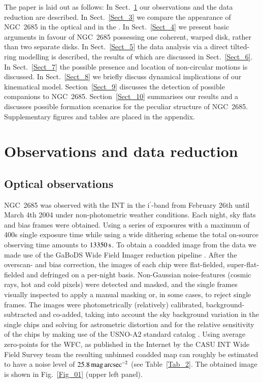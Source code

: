 \documentclass[oldversion]{aa}
\begin{document}
The paper is laid out as follows: In Sect.~\ref{Sect_2} our
observations and the data reduction are described. In
Sect.~\ref{Sect_3} we compare the appearance of NGC~2685 in the optical
and in the .  In Sect.~\ref{Sect_4} we present basic
arguments in favour of NGC~2685 possessing one coherent, warped disk,
rather than two separate disks. In Sect.~\ref{Sect_5} the data
analysis via a direct tilted-ring modelling is described, the results
of which are discussed in Sect.~\ref{Sect_6}. In
Sect.~\ref{Sect_7} the possible presence and location of
non-circular motions is discussed. In Sect.~\ref{Sect_8} we briefly
discuss dynamical implications of our kinematical
model. Section~\ref{Sect_9} discusses the detection of possible
companions to NGC~2685. Section~\ref{Sect_10} summarises our results
and a discusses possible formation scenarios for the peculiar
structure of NGC~2685. Supplementary figures and tables are placed in
the appendix.
\section{Observations and data reduction}
\label{Sect_2}
\subsection{Optical observations}
\label{Sect_2.1}
NGC~2685 was observed with the INT in the i$^\prime$-band from
February 26th until March 4th 2004 under non-photometric weather
conditions. Each night, sky flats and bias frames were obtained.
Using a series of exposures with a maximum of 400s single exposure
time while using a wide dithering scheme the total on-source observing
time amounts to $13350\,\rm s$.  To obtain a coadded image from the
data we made use of the GaBoDS Wide Field Imager reduction pipeline
\citep[][]{Schirmer03,Erben05}. After the overscan- and bias
correction, the images of each chip were flat-fielded,
super-flat-fielded and defringed on a per-night basis. Non-Gaussian
noise-features (cosmic rays, hot and cold pixels) were detected and
masked, and the single frames visually inspected to apply a
manual masking or, in some cases, to reject single frames. The images
were photometrically (relatively) calibrated,
background-subtracted and co-added, taking into account the sky
background variation in the single chips and solving for astrometric
distortion and for the relative sensitivity of the chips by making use
of the USNO-A2 standard catalog \citep[][]{Monet98}. Using average
zero-points for the WFC, as published in the Internet by the CASU INT
Wide Field Survey team \citep[][]{McMahon01} the resulting unbinned
coadded map can roughly be estimated to have a noise level of
$25.8\,{\rm mag}\,{\rm arcsec}^{-2}$ (see Table~\ref{Tab_2}. The
obtained image is shown in Fig.~\ref{Fig_01} (upper left panel).
%
%
\end{document}
